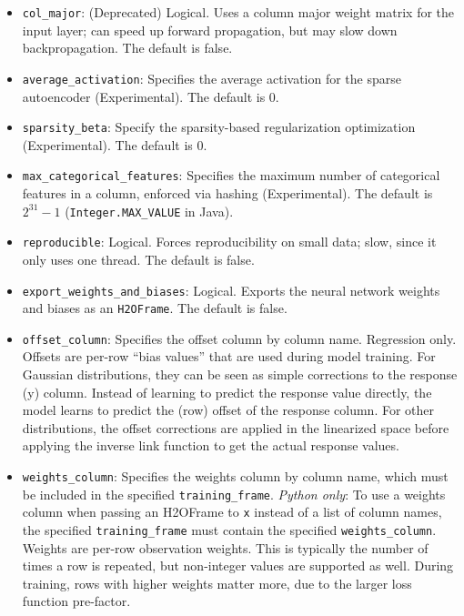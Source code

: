 {{\begin{itemize}
\item \texttt{col\_major}: (Deprecated) Logical. Uses a column major weight matrix for the input layer; can speed up forward propagation, but may slow down backpropagation. The default is false.

\item \texttt{average\_activation}: Specifies the average activation for the sparse autoencoder (Experimental).
The default is 0.

\item \texttt{sparsity\_beta}: Specify the sparsity-based regularization optimization (Experimental).  The default is 0. 

\item \texttt{max\_categorical\_features}:  Specifies the maximum number of categorical features in a column, enforced via hashing (Experimental).  The default is $2^{31}-1$ (\texttt{Integer.MAX\_VALUE} in Java).

\item \texttt{reproducible}: Logical. Forces reproducibility on small data; slow, since it only uses one thread.  The default is false.

\item \texttt{export\_weights\_and\_biases}: Logical. Exports the neural network weights and biases as an \texttt{H2OFrame}.  The default is false.

%

\item \texttt{offset\_column}:  Specifies the offset column by column name.  Regression only.  Offsets are per-row ``bias values'' that are used during model training. For Gaussian distributions, they can be seen as simple corrections to the response (y) column. Instead of learning to predict the response value directly, the model learns to predict the (row) offset of the response column. For other distributions, the offset corrections are applied in the linearized space before applying the inverse link function to get the actual response values. 

\item \texttt{weights\_column}: Specifies the weights column by column name, which must be included in the specified \texttt{training\_frame}. \textit{Python only}: To use a weights column when passing an H2OFrame to \texttt{x} instead of a list of column names, the specified \texttt{training\_frame} must contain the specified \texttt{weights\_column}. Weights are per-row observation weights. This is typically the number of times a row is repeated, but non-integer values are supported as well. During training, rows with higher weights matter more, due to the larger loss function pre-factor.


\end{itemize}}}

